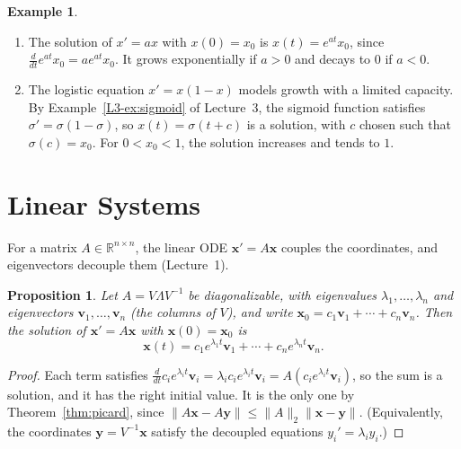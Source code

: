 \documentclass[11pt]{article}
\newcommand{\norm}[1]{\lVert #1 \rVert}
\theoremstyle{definition}
\newtheorem{example}[definition]{Example}
\theoremstyle{plain}
\newtheorem{proposition}[definition]{Proposition}
\theoremstyle{remark}
\begin{document}
\begin{example}\label{ex:scalar-ode}
    \begin{enumerate}
        \item The solution of $x' = ax$ with $x(0) = x_0$ is $x(t) = e^{at}x_0$, since $\frac{d}{dt}e^{at}x_0 = ae^{at}x_0$. It grows exponentially if $a > 0$ and decays to $0$ if $a < 0$.
        \item The logistic equation $x' = x(1 - x)$ models growth with a limited capacity. By Example~\ref{L3-ex:sigmoid} of Lecture~3, the sigmoid function satisfies $\sigma' = \sigma(1 - \sigma)$, so $x(t) = \sigma(t + c)$ is a solution, with $c$ chosen such that $\sigma(c) = x_0$. For $0 < x_0 < 1$, the solution increases and tends to $1$.
    \end{enumerate}
\end{example}

\section{Linear Systems}\label{sec:linear-ode}


For a matrix $A \in \mathbb{R}^{n \times n}$, the linear ODE $\mathbf{x}' = A\mathbf{x}$ couples the coordinates, and eigenvectors decouple them (Lecture~1).

\begin{proposition}\label{prop:linear-ode}
    Let $A = V\Lambda V^{-1}$ be diagonalizable, with eigenvalues $\lambda_1, \ldots, \lambda_n$ and eigenvectors $\mathbf{v}_1, \ldots, \mathbf{v}_n$ (the columns of $V$), and write $\mathbf{x}_0 = c_1\mathbf{v}_1 + \cdots + c_n\mathbf{v}_n$. Then the solution of $\mathbf{x}' = A\mathbf{x}$ with $\mathbf{x}(0) = \mathbf{x}_0$ is
    \[\mathbf{x}(t) = c_1e^{\lambda_1 t}\mathbf{v}_1 + \cdots + c_ne^{\lambda_n t}\mathbf{v}_n.\]
\end{proposition}

\begin{proof}
    Each term satisfies $\frac{d}{dt}c_ie^{\lambda_i t}\mathbf{v}_i = \lambda_ic_ie^{\lambda_i t}\mathbf{v}_i = A(c_ie^{\lambda_i t}\mathbf{v}_i)$, so the sum is a solution, and it has the right initial value. It is the only one by Theorem~\ref{thm:picard}, since $\norm{A\mathbf{x} - A\mathbf{y}} \leq \norm{A}_2\norm{\mathbf{x} - \mathbf{y}}$. (Equivalently, the coordinates $\mathbf{y} = V^{-1}\mathbf{x}$ satisfy the decoupled equations $y_i' = \lambda_i y_i$.)
\end{proof}
\end{document}
